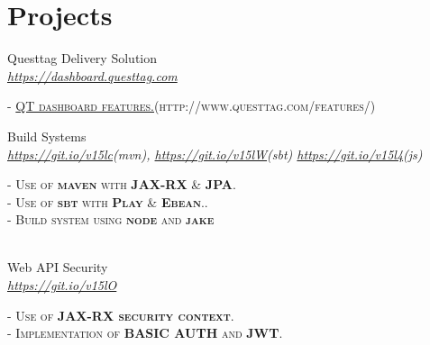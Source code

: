 \documentclass[10pt]{article} %
\begin{document}
{\begin{minipage}[t]{0.5\textwidth}

\section{Projects} 



{\raggedright\large Questtag Delivery Solution\\
\textit{\href{https://dashboard.questtag.com}{https://dashboard.questtag.com}}\\[2pt]
}

\textsc{- \href{http://www.questtag.com/features/}{QT dashboard features.}(http://www.questtag.com/features/)}\\




{\raggedright\large Build Systems \\
	\textit{\href {https://github.com/Bitaron/java-maven}{https://git.io/v15lc}(mvn), \href{https://github.com/Bitaron/java-sbt}{https://git.io/v15lW}(sbt)
		\href{https://github.com/Bitaron/js}{https://git.io/v15l4}(js)}\\[5pt]}
\textsc{- Use of \textbf{maven} with \textbf{JAX-RX} \& \textbf{JPA}. }\\
\textsc{- Use of \textbf{sbt} with \textbf{Play} \& \textbf{Ebean}..}\\
\textsc{- Build system using \textbf{node} and \textbf{jake}}\\
\normalsize{}\\





{\raggedright\large Web API Security \\
	\textit{\href {https://github.com/Bitaron/java-maven/tree/security}{https://git.io/v15lO}}\\[5pt]}
\textsc{- Use of \textbf{JAX-RX security context}.}\\
\textsc{- Implementation of  \textbf{BASIC AUTH} and  \textbf{JWT}.}\\



\end{minipage}}
\end{document}

